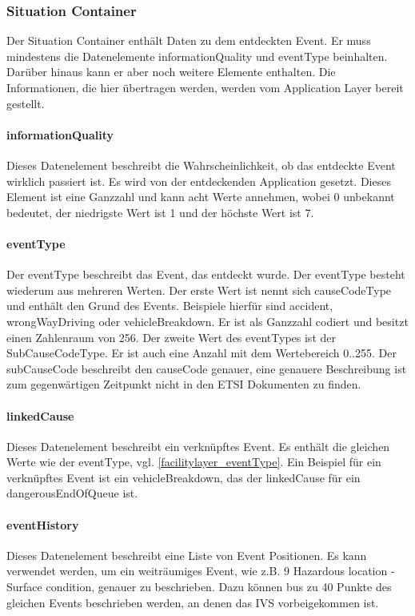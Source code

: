\subsubsection{Situation Container}
Der Situation Container enthält Daten zu dem entdeckten Event. Er muss mindestens die Datenelemente informationQuality und eventType beinhalten. Darüber hinaus kann er aber noch weitere Elemente enthalten. Die Informationen, die hier übertragen werden, werden vom Application Layer bereit gestellt.

\paragraph{informationQuality}
Dieses Datenelement beschreibt die Wahrscheinlichkeit, ob das entdeckte Event wirklich passiert ist. Es wird von der entdeckenden Application gesetzt. Dieses Element ist eine Ganzzahl und kann acht Werte annehmen, wobei 0 unbekannt bedeutet, der niedrigste Wert ist 1 und der höchste Wert ist 7.

\paragraph{eventType \label{facilitylayer_eventType}}
Der eventType beschreibt das Event, das entdeckt wurde. Der eventType besteht wiederum aus mehreren Werten. Der erste Wert ist nennt sich causeCodeType und enthält den Grund des Events. Beispiele hierfür sind accident,  wrongWayDriving oder vehicleBreakdown. Er ist als Ganzzahl codiert und besitzt einen Zahlenraum von 256. Der zweite Wert des eventTypes ist der SubCauseCodeType. Er ist auch eine Anzahl mit dem Wertebereich 0..255. Der subCauseCode beschreibt den causeCode genauer, eine genauere Beschreibung ist zum gegenwärtigen Zeitpunkt nicht in den \ac{ETSI} Dokumenten zu finden.

\paragraph{linkedCause}
Dieses Datenelement beschreibt ein verknüpftes Event. Es enthält die gleichen Werte wie der eventType, vgl.  \ref{facilitylayer_eventType}. Ein Beispiel für ein verknüpftes Event ist ein vehicleBreakdown, das der linkedCause für ein dangerousEndOfQueue ist.  



\paragraph{eventHistory}
Dieses Datenelement beschreibt eine Liste von Event Positionen. Es kann verwendet werden, um ein weiträumiges Event, wie z.B. 9 Hazardous location - Surface condition, genauer zu beschrieben. Dazu können bus zu 40 Punkte des gleichen Events beschrieben werden, an denen das \ac{IVS} vorbeigekommen ist.


